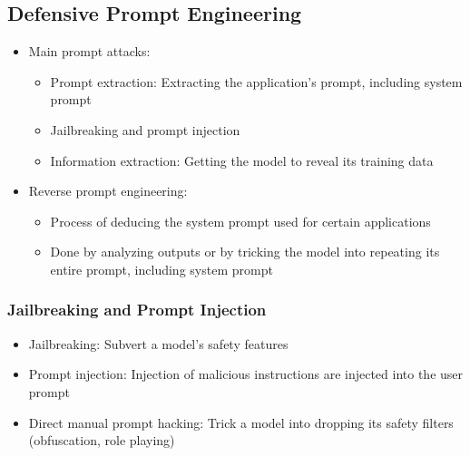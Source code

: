 \documentclass[11pt]{scrartcl}
\begin{document}
\subsection*{Defensive Prompt Engineering}
\begin{itemize}
	\item Main prompt attacks:
	\begin{itemize}
		\item Prompt extraction: Extracting the application's prompt, including system prompt
		\item Jailbreaking and prompt injection
		\item Information extraction: Getting the model to reveal its training data
	\end{itemize}
	\item Reverse prompt engineering: 
	\begin{itemize}
		\item Process of deducing the system prompt used for certain applications
		\item Done by analyzing outputs or by tricking the model into repeating its entire prompt, including system prompt
	\end{itemize}
\end{itemize}

\subsubsection*{Jailbreaking and Prompt Injection}
\begin{itemize}
	\item Jailbreaking: Subvert a model's safety features
	\item Prompt injection: Injection of malicious instructions are injected into the user prompt
	\item Direct manual prompt hacking: Trick a model into dropping its safety filters (obfuscation, role playing)
\end{itemize}
\end{document}
